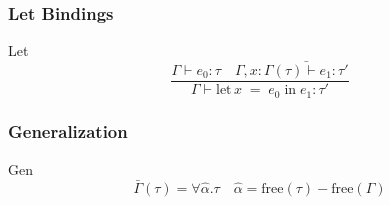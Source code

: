 \documentclass{beamer}
\begin{document}
\begin{frame}
  \frametitle{Let Bindings}
  \begin{exampleblock}{Let}
    \[
      \frac{\Gamma \vdash e_0 : \tau \quad \Gamma, x : \bar{\Gamma(\tau) \vdash e_1 : \tau'}}
      {\Gamma \vdash \text{let}\, x\; =\; e_0\; \text{in}\; e_1 : \tau'}
    \]
  \end{exampleblock}
\end{frame}

\begin{frame}
  \frametitle{Generalization}
  \begin{exampleblock}{Gen}
    \[
      \bar{\Gamma}(\tau) = \forall \hat{\alpha} . \tau \quad \hat{\alpha} = \text{free}(\tau) - \text{free}(\Gamma)
    \]
  \end{exampleblock}
\end{frame}
\end{document}
